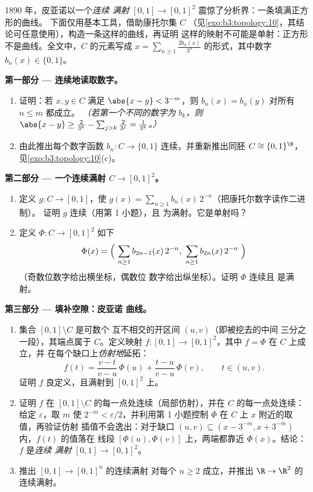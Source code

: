 \begin{problem}\label{pb:b3:topology:1}
1890 年，皮亚诺以一个\emph{连续
满射} $[0,1] \to [0,1]^2$ 震惊了分析界：一条填满正方形的曲线。
下面仅用基本工具，借助康托尔集 $C$
（见\cref{exo:b3:topology:10}，其结论可任意使用），构造一条这样的曲线，再证明
这样的映射不可能是单射：正方形
不是曲线。全文中，$C$ 的元素写成 $x =
\sum_{n \geq 1} \frac{2b_n(x)}{3^n}$ 的形式，其中数字 $b_n(x) \in
\{0, 1\}$。

\medskip
\noindent\textbf{第一部分 --- 连续地读取数字。}
\begin{enumerate}
  \item 证明：若 $x, y \in C$ 满足 $\abs{x - y} <
        3^{-m}$，则 $b_n(x) = b_n(y)$ 对所有 $n \leq m$ 都成立。
        \emph{（若第一个不同的数字为 $b_k$，则
        $\abs{x - y} \geq \frac{2}{3^k} - \sum_{j>k}\frac2{3^j}
        = \frac1{3^k}$。）}
  \item 由此推出每个数字函数 $b_n \colon C \to \{0,
        1\}$ 连续，并重新推出同胚 $C
        \cong \{0,1\}^\N$，见\cref{exo:b3:topology:10}(c)。
\end{enumerate}

\medskip
\noindent\textbf{第二部分 --- 一个连续满射 $C \to
[0,1]^2$。}
\begin{enumerate}[resume]
  \item 定义 $g \colon C \to [0,1]$，使 $g(x) = \sum_{n\geq1}
        b_n(x)\,2^{-n}$（把康托尔数字读作二进制）。
        证明 $g$ 连续（用第 1 小题），且
        为满射。它是单射吗？
  \item 定义 $\Phi \colon C \to [0,1]^2$ 如下
        \[
        \Phi(x) = \Bigl(\ \sum_{n\geq1} b_{2n-1}(x)\,2^{-n},\
        \sum_{n\geq1} b_{2n}(x)\,2^{-n}\ \Bigr)
        \]
        （奇数位数字给出横坐标，偶数位
        数字给出纵坐标）。证明 $\Phi$ 连续且
        是满射。
\end{enumerate}

\medskip
\noindent\textbf{第三部分 --- 填补空隙：皮亚诺
曲线。}
\begin{enumerate}[resume]
  \item 集合 $[0,1] \setminus C$ 是可数个
        互不相交的开区间 $(u, v)$（即被挖去的中间
        三分之一段），其端点属于 $C$。定义映射 $f \colon
        [0,1] \to [0,1]^2$，其中 $f = \Phi$ 在 $C$ 上成立，并
        在每个缺口上\emph{仿射地}延拓：
        \[
        f(t) = \frac{v - t}{v - u}\,\Phi(u) +
        \frac{t - u}{v - u}\,\Phi(v),
        \qquad t \in (u, v).
        \]
        证明 $f$ 良定义，且满射到
        $[0,1]^2$ 上。
  \item 证明 $f$ 在 $[0,1]
        \setminus C$ 的每一点处连续（局部仿射），并在
        $C$ 的每一点处连续：给定 $\varepsilon$，取 $m$ 使 $2^{-m} <
        \varepsilon/2$，并利用第 1 小题控制 $\Phi$ 在
        $C$ 上 $x$ 附近的取值，再验证仿射
        插值不会逸出：对于缺口 $(u,v) \subseteq
        (x - 3^{-m}, x + 3^{-m})$ 内，$f(t)$ 的值落在
        线段 $[\Phi(u), \Phi(v)]$ 上，两端都靠近
        $\Phi(x)$。结论：$f$ 是\emph{连续
        满射} $[0,1] \to [0,1]^2$。
  \item 推出 $[0,1] \to [0,1]^n$ 的连续满射
        对每个 $n \geq 2$ 成立，并推出 $\R \to \R^2$ 的连续满射。
\end{enumerate}


\end{problem}
